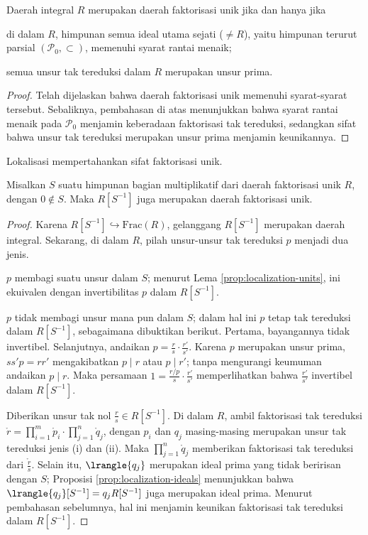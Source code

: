 \begin{proposition}
	Daerah integral $R$ merupakan daerah faktorisasi unik jika dan hanya jika
	\begin{compactitem}
		\item di dalam $R$, himpunan semua ideal utama sejati ($\neq R$), yaitu himpunan terurut parsial $(\mathcal{P}_0, \subset)$, memenuhi syarat rantai menaik;
		\item semua unsur tak tereduksi dalam $R$ merupakan unsur prima.
	\end{compactitem}
\end{proposition}
\begin{proof}
	Telah dijelaskan bahwa daerah faktorisasi unik memenuhi syarat-syarat tersebut. Sebaliknya, pembahasan di atas menunjukkan bahwa syarat rantai menaik pada $\mathcal{P}_0$ menjamin keberadaan faktorisasi tak tereduksi, sedangkan sifat bahwa unsur tak tereduksi merupakan unsur prima menjamin keunikannya.
\end{proof}

Lokalisasi mempertahankan sifat faktorisasi unik.
\begin{proposition}\label{prop:UFD-localization}
	Misalkan $S$ suatu himpunan bagian multiplikatif dari daerah faktorisasi unik $R$, dengan $0 \notin S$. Maka $R[S^{-1}]$ juga merupakan daerah faktorisasi unik.
\end{proposition}
\begin{proof}
	Karena $R[S^{-1}] \hookrightarrow \text{Frac}(R)$, gelanggang $R[S^{-1}]$ merupakan daerah integral. Sekarang, di dalam $R$, pilah unsur-unsur tak tereduksi $p$ menjadi dua jenis.
	\begin{inparaenum}[(i)]
		\item $p$ membagi suatu unsur dalam $S$; menurut Lema \ref{prop:localization-units}, ini ekuivalen dengan invertibilitas $p$ dalam $R[S^{-1}]$.
		\item $p$ tidak membagi unsur mana pun dalam $S$; dalam hal ini $p$ tetap tak tereduksi dalam $R[S^{-1}]$, sebagaimana dibuktikan berikut. Pertama, bayangannya tidak invertibel. Selanjutnya, andaikan $p = \frac{r}{s} \cdot \frac{r'}{s'}$. Karena $p$ merupakan unsur prima, $ss'p = rr'$ mengakibatkan $p \mid r$ atau $p \mid r'$; tanpa mengurangi keumuman andaikan $p \mid r$. Maka persamaan $1 = \frac{r/p}{s} \cdot \frac{r'}{s'}$ memperlihatkan bahwa $\frac{r'}{s'}$ invertibel dalam $R[S^{-1}]$.
	\end{inparaenum}

	Diberikan unsur tak nol $\frac{r}{s} \in R[S^{-1}]$. Di dalam $R$, ambil faktorisasi tak tereduksi $\mathring{r} = \prod_{i=1}^m \mathring{p}_i \cdot \prod_{j=1}^n \mathring{q}_j$, dengan $p_i$ dan $q_j$ masing-masing merupakan unsur tak tereduksi jenis (i) dan (ii). Maka $\prod_{j=1}^n \mathring{q}_j$ memberikan faktorisasi tak tereduksi dari $\mathring{\frac{r}{s}}$. Selain itu, $\lrangle{q_j}$ merupakan ideal prima yang tidak beririsan dengan $S$; Proposisi \ref{prop:localization-ideals} menunjukkan bahwa $\lrangle{q_j}[S^{-1}] = q_j R[S^{-1}]$ juga merupakan ideal prima. Menurut pembahasan sebelumnya, hal ini menjamin keunikan faktorisasi tak tereduksi dalam $R[S^{-1}]$.
\end{proof}

